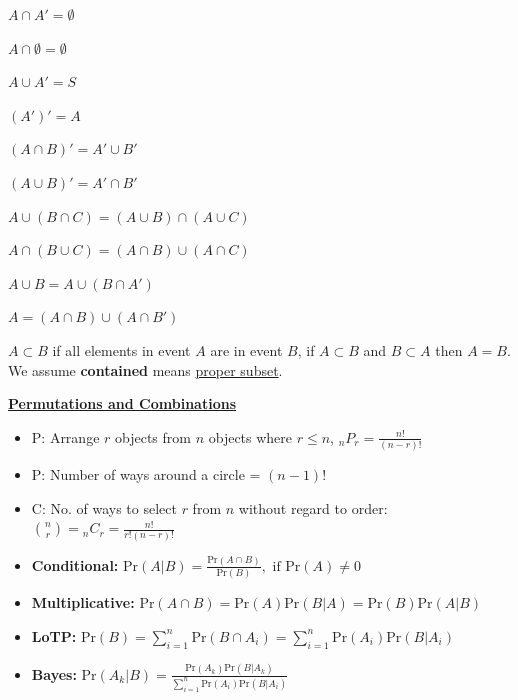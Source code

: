 \documentclass[10pt,landscape]{article}
\begin{document}
\begin{multicols*}{3}
\begin{enumerate}[topsep=0pt,noitemsep,wide=0pt, leftmargin=\dimexpr\labelwidth + 2\labelsep\relax]
    \begin{minipage}[c]{0.35\linewidth}
        \item $A \cap A'= \emptyset$
        \item $A \cap \emptyset = \emptyset$
        \item $A \cup A' = S$
        \item $(A')' = A$
        \item $(A \cap B)' = A' \cup B'$
    \end{minipage}
    \begin{minipage}[c]{0.55\linewidth}
        \item $(A \cup B)' = A' \cap B'$
        \item $A \cup (B \cap C)=(A \cup B) \cap (A \cup C)$
        \item $A \cap (B \cup C)=(A \cap B) \cup (A \cap C)$
        \item $A \cup B = A \cup (B \cap A')$
        \item $A = (A \cap B) \cup (A \cap B')$
    \end{minipage}
\end{enumerate}

$A \subset B$ if all elements in event $A$ are in event $B$, if $A\subset B$ and $B \subset A$ then $A=B$.
We assume \textbf{contained} means \underline{proper subset}.

\textbf{\underline{Permutations and Combinations}} \\ 
\begin{itemize}[topsep=0pt,noitemsep,wide=0pt, leftmargin=\dimexpr{} + 2\relax]
    \item P: Arrange $r$ objects from $n$ objects where $r \leq n$, $_nP_r=\frac{n!}{(n-r)!}$
    \item P: Number of ways around a circle = $(n-1)!$
    \item C: No. of ways to select $r$ from $n$ without regard to order: ${n\choose r}={_nC_r}=\frac{n!}{r!(n-r)!}$
\end{itemize}

\begin{itemize}[topsep=0pt,noitemsep,wide=0pt, leftmargin=\dimexpr{} + 2\relax]
    \item \textbf{Conditional:} $\text{Pr}(A|B)=\frac{\text{Pr}(A\cap B)}{\text{Pr}(B)}, \text{ if Pr}(A) \neq 0$
    \item \textbf{Multiplicative:} $\text{Pr}(A\cap B)=\text{Pr}(A)\text{Pr}(B|A)=\text{Pr}(B)\text{Pr}(A|B)$
    \item \textbf{LoTP:} $\text{Pr}(B)=\sum^n_{i=1}\text{Pr}(B\cap A_i)=\sum^n_{i=1}\text{Pr}(A_i)\text{Pr}(B|A_i)$
    \item \textbf{Bayes:} $\text{Pr}(A_k|B)=\frac{\text{Pr}(A_k)\text{Pr}(B|A_k)}{\sum_{i=1}^n\text{Pr}(A_i)\text{Pr}(B|A_i)}$ 
\end{itemize}


\end{multicols*}
\end{document}
